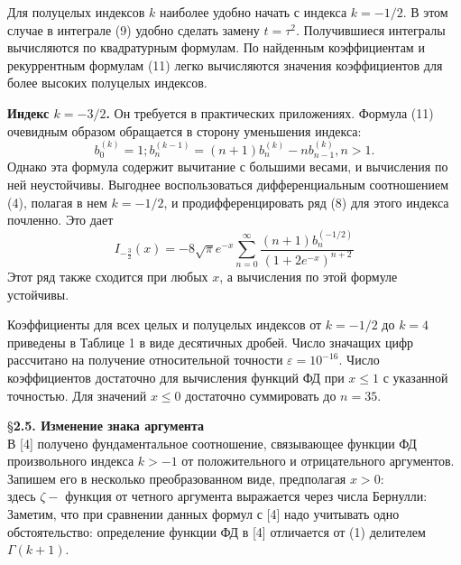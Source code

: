 Для полуцелых индексов $k$ наиболее удобно начать с индекса $k = -1/2$. В
этом случае в интеграле (9) удобно сделать замену $t = \tau^2$. Получившиеся
интегралы вычисляются по квадратурным формулам. По найденным
коэффициентам и рекуррентным формулам (11) легко вычисляются значения
коэффициентов для более высоких полуцелых индексов.

\textbf{Индекс $k = -3/2$.} Он требуется в практических приложениях. Формула
(11) очевидным образом обращается в сторону уменьшения индекса:
\begin{equation}
b_0^{(k)}=1;b_n^(k-1)=(n+1)b_n^{(k)}-nb_{n-1}^{(k)}, n > 1.
\end{equation}
Однако эта формула содержит вычитание с большими весами, и вычисления по
ней неустойчивы. Выгоднее воспользоваться дифференциальным
соотношением (4), полагая в нем $k = -1/2$, и продифференцировать ряд (8) для
этого индекса почленно. Это дает
\begin{equation}
I_{-\frac{3}{2}}(x)=-8\sqrt{\pi}e^{-x}\sum\limits_{n=0}^{\infty} \frac{(n+1)b_n^{(-1/2)}}{(1+2e^{-x})^{n+2}}
\end{equation}
Этот ряд также сходится при любых $x$, а вычисления по этой формуле
устойчивы.

Коэффициенты для всех целых и полуцелых индексов от $k = -1/2$ до $k = 4$
приведены в Таблице 1 в виде десятичных дробей. Число значащих цифр
рассчитано на получение относительной точности $\varepsilon = 10^{-16}$. Число
коэффициентов достаточно для вычисления функций ФД при $x \leqslant 1$ с указанной
точностью. Для значений $x \leqslant 0$ достаточно суммировать до $n = 35$.



\S \textbf{2.5. Изменение знака аргумента}
\\

В [4] получено фундаментальное соотношение, связывающее функции ФД
произвольного индекса $k > -1$ от положительного и отрицательного
аргументов. Запишем его в несколько преобразованном виде, предполагая
$x > 0$:
\begin{equation}
\label{eq:ref_2_5_1}
\end{equation}
здесь $\zeta -$ функция от четного аргумента выражается через числа Бернулли:
\begin{equation}
\label{eq:ref_2_5_2}
\end{equation}
Заметим, что при сравнении данных формул с [4] надо учитывать одно
обстоятельство: определение функции ФД в [4] отличается от (1) делителем $\Gamma(k + 1)$.

